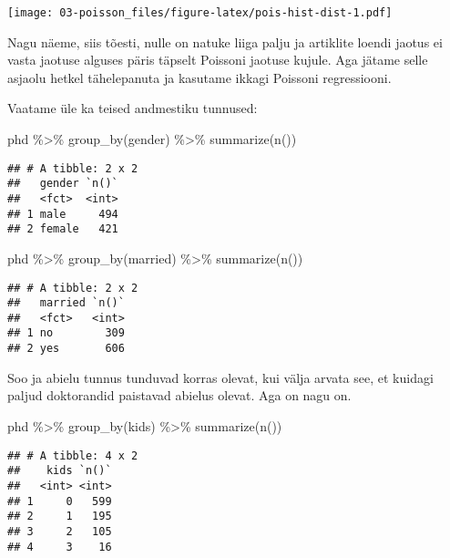 \documentclass[
]{book}
\newenvironment{Shaded}{\begin{snugshade}}{\end{snugshade}}
\newcommand{\FunctionTok}[1]{\textcolor[rgb]{0.00,0.00,0.00}{#1}}
\newcommand{\NormalTok}[1]{#1}
\newcommand{\SpecialCharTok}[1]{\textcolor[rgb]{0.00,0.00,0.00}{#1}}
\begin{document}
\texttt{[image: 03-poisson\_files/figure-latex/pois-hist-dist-1.pdf]}

Nagu näeme, siis tõesti, nulle on natuke liiga palju ja artiklite loendi jaotus ei vasta jaotuse alguses päris täpselt Poissoni jaotuse kujule. Aga jätame selle asjaolu hetkel tähelepanuta ja kasutame ikkagi Poissoni regressiooni.

Vaatame üle ka teised andmestiku tunnused:

\begin{Shaded}
\begin{Highlighting}[]
\NormalTok{phd }\SpecialCharTok{\%\textgreater{}\%} 
  \FunctionTok{group\_by}\NormalTok{(gender) }\SpecialCharTok{\%\textgreater{}\%} 
  \FunctionTok{summarize}\NormalTok{(}\FunctionTok{n}\NormalTok{())}
\end{Highlighting}
\end{Shaded}

\begin{verbatim}
## # A tibble: 2 x 2
##   gender `n()`
##   <fct>  <int>
## 1 male     494
## 2 female   421
\end{verbatim}

\begin{Shaded}
\begin{Highlighting}[]
\NormalTok{phd }\SpecialCharTok{\%\textgreater{}\%} 
  \FunctionTok{group\_by}\NormalTok{(married) }\SpecialCharTok{\%\textgreater{}\%} 
  \FunctionTok{summarize}\NormalTok{(}\FunctionTok{n}\NormalTok{())}
\end{Highlighting}
\end{Shaded}

\begin{verbatim}
## # A tibble: 2 x 2
##   married `n()`
##   <fct>   <int>
## 1 no        309
## 2 yes       606
\end{verbatim}

Soo ja abielu tunnus tunduvad korras olevat, kui välja arvata see, et kuidagi paljud doktorandid paistavad abielus olevat. Aga on nagu on.

\begin{Shaded}
\begin{Highlighting}[]
\NormalTok{phd }\SpecialCharTok{\%\textgreater{}\%} 
  \FunctionTok{group\_by}\NormalTok{(kids) }\SpecialCharTok{\%\textgreater{}\%} 
  \FunctionTok{summarize}\NormalTok{(}\FunctionTok{n}\NormalTok{())}
\end{Highlighting}
\end{Shaded}

\begin{verbatim}
## # A tibble: 4 x 2
##    kids `n()`
##   <int> <int>
## 1     0   599
## 2     1   195
## 3     2   105
## 4     3    16
\end{verbatim}
\end{document}
